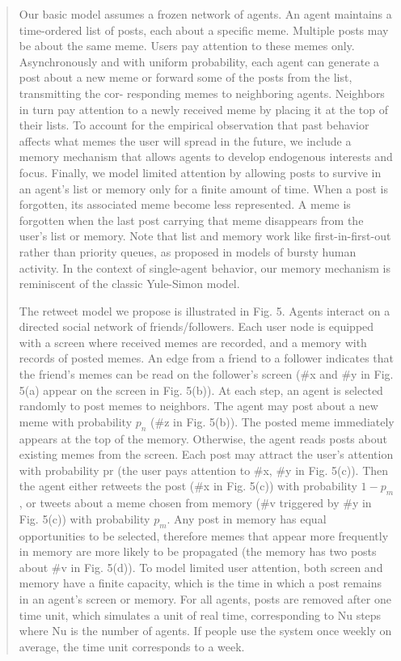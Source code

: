 \documentclass{WeSTassignment}
\begin{document}
\blockquote{ Our basic model assumes a frozen network of agents. An agent maintains a
time-ordered list of posts, each about a specific meme. Multiple posts may be
about the same meme. Users pay attention to these memes only. Asynchronously and with uniform probability, each agent can generate a post about a
new meme or forward some of the posts from the list, transmitting the cor-
responding memes to neighboring agents. Neighbors in turn pay attention to
a newly received meme by placing it at the top of their lists. To account for
the empirical observation that past behavior affects what memes the user will
spread in the future, we include a memory mechanism that allows agents to
develop endogenous interests and focus. Finally, we model limited attention
by allowing posts to survive in an agent’s list or memory only for a finite
amount of time. When a post is forgotten, its associated meme become less
represented. A meme is forgotten when the last post carrying that meme
disappears from the user’s list or memory. Note that list and memory work
like first-in-first-out rather than priority queues, as proposed in models of
bursty human activity. In the context of single-agent behavior, our memory
mechanism is reminiscent of the classic Yule-Simon model.


The retweet model we propose is illustrated in Fig. 5. Agents interact on a
directed social network of friends/followers. Each user node is equipped with
a screen where received memes are recorded, and a memory with records of
posted memes. An edge from a friend to a follower indicates that the friend’s
memes can be read on the follower’s screen (\#x and \#y in Fig. 5(a) appear on
the screen in Fig. 5(b)). At each step, an agent is selected randomly to post memes to neighbors. The agent may post about a new meme with probability $p_n$ (\#z in Fig. 5(b)). The posted meme immediately appears at the top of the memory. Otherwise, the agent reads posts about existing memes from the screen. Each post may attract the user’s attention with probability pr (the user pays attention to \#x, \#y in Fig. 5(c)). Then the agent either retweets the post (\#x in Fig. 5(c)) with probability $1 − p_m$, or tweets about a meme chosen from memory (\#v triggered by \#y in Fig. 5(c)) with probability $p_m$. Any post in memory has equal opportunities to be selected, therefore memes that appear more frequently in memory are more likely to be propagated (the memory has two posts about \#v in Fig. 5(d)). To model limited user attention, both screen and memory have a finite capacity, which is the time in which a post remains in an agent’s screen or memory. For all agents, posts are removed after one time unit, which simulates a unit of real time, corresponding to Nu steps where Nu is the number of agents. If people use
the system once weekly on average, the time unit corresponds to a week.}
\end{document}
